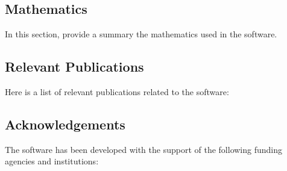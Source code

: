 \subsection{Mathematics}
\label{sec:\VAR{software.name}:mathematics}

In this section, provide a summary the mathematics used in the software.


\subsection{Relevant Publications}
\label{sec:\VAR{software.name}:publications}

Here is a list of relevant publications related to the software:


\subsection{Acknowledgements}
\label{sec::\VAR{software.name}:acknowledgements}

The software has been developed with the support of the following funding agencies and institutions:








